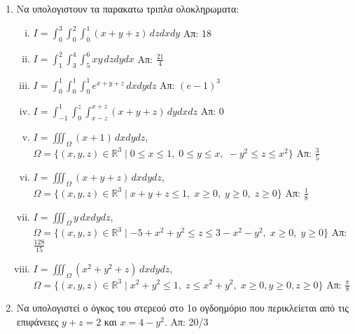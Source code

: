 


\pagestyle{askhseis}
\everymath{\displaystyle}



\begin{center}
  \minibox{\large\bf \textcolor{Col1}{Ασκήσεις Τριπλο Ολοκλήρωμα}}
\end{center}

\vspace{\baselineskip}

\begin{enumerate}
  \item Να υπολογιστουν τα παρακατω τριπλα ολοκληρωματα:
    \begin{enumerate}[i)]
      \item $ I=\int_{0}^{3}\!\!\int_{0}^{2}\!\!\int_{0}^{1}(x+y+z)\,dzdxdy $ 
        \hfill Απ: 18  
      \item $  I=\int_{1}^{2}\!\!\int_{3}^{4}\!\!\int_{5}^{6}xy\,dzdydx  $ 
        \hfill Απ: $ \frac{21}{4} $ 
      \item $ I=\int_{0}^{1}\!\!\int_{0}^{1}\!\!\int_{0}^{1}e^{x+y+z}\,dxdydz $ 
        \hfill Απ: $ (e-1)^{3} $
      \item $ I=\int_{-1}^{1}\!\!\int_{0}^{z}\!\int_{x-z}^{x+z}(x+y+z)\,dydxdz $ 
        \hfill Απ: 0  
      \item $ I=\iiint_{\Omega}(x+1)\,dxdydz $, \quad $ \Omega = \{(x,y,z)\in 
          \mathbb{R}^{3} \mid 0 \leq x \leq 1,\; 0 \leq y \leq x,\; -y^{2} \leq z 
        \leq x^{2} \}$ 
        \hfill Απ: $ \frac{3}{5} $ 
      \item $ I=\iiint_{\Omega} (x+y+z)\,dxdydz $, \quad $ \Omega= \{(x,y,z)\in 
        \mathbb{R}^{3} \mid x+y+z \leq 1,\; x \geq 0,\; y \geq 0,\; z \geq 0 \}  $ 
        \hfill Απ: $ \frac{1}{8} $ 
      \item $ I=\iiint_{\Omega} y\,dxdydz $, \quad $ \Omega = \{ (x,y,z) \in 
          \mathbb{R}^{3} \mid -5 + x^{2}+y^{2} \leq z \leq 3 - x^{2}-y^{2}, \; x 
        \geq 0, \; y \geq 0\}$ 
        \hfill Απ: $ \frac{128}{15} $  
      \item $ I = \iiint_{\Omega} (x^{2}+y^{2}+z) \,dxdydz $, \quad $\Omega = \{ 
        (x,y,z) \in \mathbb{R}^{3} \mid x^{2}+y^{2} \leq 1,\; z \leq x^{2}+y^{2}, 
      \; x \geq 0, y \geq 0, z \geq 0\} $ \hfill Απ: $ \frac{\pi}{8} $ 
    \end{enumerate}

  \item Να υπολογιστεί ο όγκος του στερεού στο 1ο ογδοημόριο που περικλείεται από τις 
    επιφάνειες $y+z=2$ και $x=4-y^{2}$. \hfill Απ: 20/3 


\end{enumerate}
